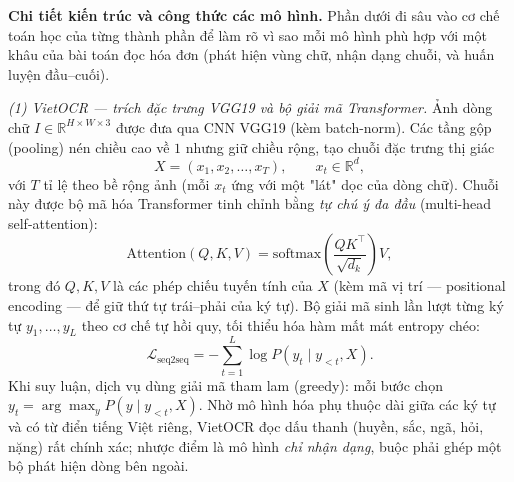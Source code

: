 \medskip
\noindent\textbf{Chi tiết kiến trúc và công thức các mô hình.} Phần dưới đi sâu vào cơ chế toán học của từng thành phần để làm rõ vì sao mỗi mô hình phù hợp với một khâu của bài toán đọc hóa đơn (phát hiện vùng chữ, nhận dạng chuỗi, và huấn luyện đầu–cuối).

\noindent\textit{(1) VietOCR — trích đặc trưng VGG19 và bộ giải mã Transformer.}
Ảnh dòng chữ $I \in \mathbb{R}^{H\times W\times 3}$ được đưa qua CNN VGG19 (kèm batch-norm). Các tầng gộp (pooling) nén chiều cao về $1$ nhưng giữ chiều rộng, tạo chuỗi đặc trưng thị giác
\[
  X = (x_1, x_2, \dots, x_T), \qquad x_t \in \mathbb{R}^{d},
\]
với $T$ tỉ lệ theo bề rộng ảnh (mỗi $x_t$ ứng với một "lát" dọc của dòng chữ). Chuỗi này được bộ mã hóa Transformer tinh chỉnh bằng \emph{tự chú ý đa đầu} (multi-head self-attention):
\[
  \mathrm{Attention}(Q,K,V) = \mathrm{softmax}\!\left(\frac{QK^{\top}}{\sqrt{d_k}}\right)V,
\]
trong đó $Q,K,V$ là các phép chiếu tuyến tính của $X$ (kèm mã vị trí — positional encoding — để giữ thứ tự trái–phải của ký tự). Bộ giải mã sinh lần lượt từng ký tự $y_1,\dots,y_L$ theo cơ chế tự hồi quy, tối thiểu hóa hàm mất mát entropy chéo:
\[
  \mathcal{L}_{\text{seq2seq}} = -\sum_{t=1}^{L} \log P\!\left(y_t \mid y_{<t}, X\right).
\]
Khi suy luận, dịch vụ dùng giải mã tham lam (greedy): mỗi bước chọn $y_t=\arg\max_{y} P(y\mid y_{<t},X)$. Nhờ mô hình hóa phụ thuộc dài giữa các ký tự và có từ điển tiếng Việt riêng, VietOCR đọc dấu thanh (huyền, sắc, ngã, hỏi, nặng) rất chính xác; nhược điểm là mô hình \emph{chỉ nhận dạng}, buộc phải ghép một bộ phát hiện dòng bên ngoài.


